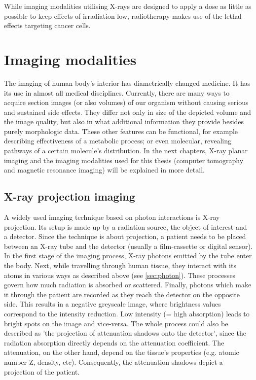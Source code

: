 While imaging modalities utilising X-rays are designed to apply a dose as little as possible to keep effects of irradiation low, radiotherapy makes use of the lethal effects targeting cancer cells. \cite{Podgorsak, Maidment2014}

\section{Imaging modalities}

The imaging of human body's interior has diametrically changed medicine.
It has its use in almost all medical disciplines.
Currently, there are many ways to acquire section images (or also volumes) of our organism without causing serious and sustained side effects.
They differ not only in size of the depicted volume and the image quality, but also in what additional information they provide besides purely morphologic data.
These other features can be functional, for example describing effectiveness of a metabolic process; or even molecular, revealing pathways of a certain molecule's distribution.
In the next chapters, X-ray planar imaging and the imaging modalities used for this thesis (computer tomography and magnetic resonance imaging) will be explained in more detail.


\subsection{X-ray projection imaging}
A widely used imaging technique based on photon interactions is X-ray projection.
Its setup is made up by a radiation source, the object of interest and a detector.
Since the technique is about projection, a patient needs to be placed between an X-ray tube and the detector (usually a film-cassette or digital sensor).
In the first stage of the imaging process, X-ray photons emitted by the tube enter the body.
Next, while travelling through human tissue, they interact with its atoms in various ways as described above (see \ref{sec:photon}).
These processes govern how much radiation is absorbed or scattered.
Finally, photons which make it through the patient are recorded as they reach the detector on the opposite side.
This results in a negative greyscale image, where brightness values correspond to the intensity reduction.
Low intensity (= high absorption) leads to bright spots on the image and vice-versa.
The whole process could also be described as 'the projection of attenuation shadows onto the detector', since the radiation absorption directly depends on the attenuation coefficient. The attenuation, on the other hand, depend on the tissue's properties (e.g. atomic number Z, density, etc).
Consequently, the attenuation shadows depict a projection of the patient.

